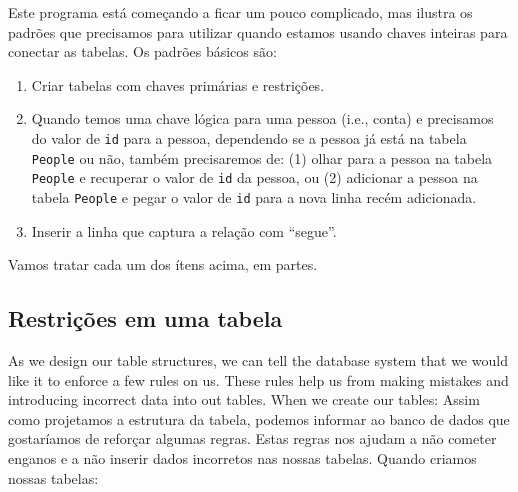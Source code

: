 %
Este programa está começando a ficar um pouco complicado, mas ilustra os
padrões que precisamos para utilizar quando estamos usando chaves inteiras
para conectar as tabelas. Os padrões básicos são:

\begin{enumerate}

\item Criar tabelas com chaves primárias e restrições.
\item Quando temos uma chave lógica para uma pessoa (i.e., conta) e precisamos
  do valor de {\tt id} para a pessoa, dependendo se a pessoa já está na tabela
  {\tt People}  ou não, também precisaremos de: (1) olhar para a pessoa na
  tabela {\tt People} e recuperar o valor de {\tt id} da pessoa, ou (2)
  adicionar a pessoa na tabela {\tt People} e pegar o valor de {\tt id} para
  a nova linha recém adicionada.
  

\item Inserir a linha que captura a relação com ``segue''.
  
\end{enumerate}

Vamos tratar cada um dos ítens acima, em partes.

\subsection{Restrições em uma tabela}

As we design our table structures, we can tell the database system 
that we would like it to enforce a few rules on us.   These rules
help us from making mistakes and introducing incorrect data into 
out tables.   When we create our tables:
Assim como projetamos a estrutura da tabela, podemos informar ao banco de dados
que gostaríamos de reforçar algumas regras. Estas regras nos ajudam a não
cometer enganos e a não inserir dados incorretos nas nossas tabelas. Quando
criamos nossas tabelas:

